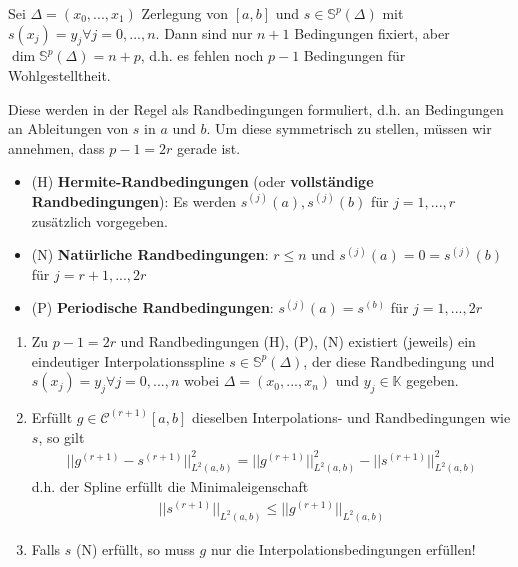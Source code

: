 \begin{remark}
	Sei $\Delta = (x_0, ..., x_1)$ Zerlegung von $[a, b]$ und $s \in \mathbb{S}^p(\Delta)$ mit $s(x_j) = y_j \forall j=0, ..., n$. Dann sind nur $n+1$ Bedingungen fixiert, aber $\dim \mathbb{S}^p(\Delta) = n+p$, d.h. es fehlen noch $p-1$ Bedingungen für Wohlgestelltheit.
	
	Diese werden in der Regel als Randbedingungen formuliert, d.h. an Bedingungen an Ableitungen von $s$ in $a$ und $b$. Um diese symmetrisch zu stellen, müssen wir annehmen, dass $p-1 = 2r$ gerade ist.
	
	\begin{itemize}
		\item (H) \textbf{Hermite-Randbedingungen} (oder \textbf{vollständige Randbedingungen}): Es werden $s^(j)(a), s^(j)(b)$ für $j = 1, ..., r$ zusätzlich vorgegeben.
		
		\item (N) \textbf{Natürliche Randbedingungen}: $r \leq n$ und $s^{(j)}(a) = 0 = s^{(j)}(b)$ für $j=r+1, ..., 2r$
		
		\item (P) \textbf{Periodische Randbedingungen}: $s^{(j)}(a) = s^{(b)}$ für $j=1, ..., 2r$
	\end{itemize}
\end{remark}

\begin{theorem}
	\begin{enumerate}
		\item Zu $p-1 = 2r$ und Randbedingungen (H), (P), (N) existiert (jeweils) ein eindeutiger Interpolationsspline $s \in \mathbb{S}^p(\Delta)$, der diese Randbedingung und $s(x_j) = y_j \forall j=0, ..., n$ wobei $\Delta = (x_0, ..., x_n)$ und $y_j \in \mathbb{K}$ gegeben.
		
		\item Erfüllt $g \in \mathcal{C}^{(r+1)}[a, b]$ dieselben Interpolations- und Randbedingungen wie $s$, so gilt
		\begin{align*}
			||g^{(r+1)} - s^{(r+1)}||_{L^2(a,b)}^2 = ||g^{(r+1)}||_{L^2(a,b)}^2 - ||s^{(r+1)}||_{L^2(a,b)}^2
		\end{align*}
		d.h. der Spline erfüllt die Minimaleigenschaft
		\begin{align*}
			||s^{(r+1)}||_{L^2(a,b)} \leq ||g^{(r+1)}||_{L^2(a,b)}
		\end{align*}
		
		\item Falls $s$ (N) erfüllt, so muss $g$ nur die Interpolationsbedingungen erfüllen!
	\end{enumerate}
\end{theorem}

